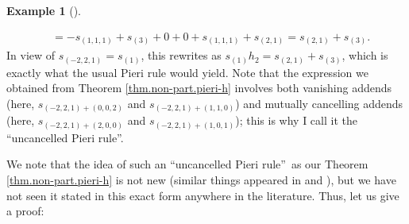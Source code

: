 \documentclass[numbers=enddot,12pt,final,onecolumn,notitlepage]{scrartcl}%
\theoremstyle{definition}
\newtheorem{exmp}[theo]{Example}
\newenvironment{example}[1][]
{\begin{exmp}[#1]\begin{leftbar}}
{\end{leftbar}\end{exmp}}
\begin{document}
\begin{example}
\begin{align*}
&  =-s_{\left(  1,1,1\right)  }+s_{\left(  3\right)  }+0+0+s_{\left(
1,1,1\right)  }+s_{\left(  2,1\right)  }=s_{\left(  2,1\right)  }+s_{\left(
3\right)  }.
\end{align*}
In view of $s_{\left(  -2,2,1\right)  }=s_{\left(  1\right)  }$, this rewrites
as $s_{\left(  1\right)  }h_{2}=s_{\left(  2,1\right)  }+s_{\left(  3\right)
}$, which is exactly what the usual Pieri rule would yield. Note that the
expression we obtained from Theorem \ref{thm.non-part.pieri-h} involves both
vanishing addends (here, $s_{\left(  -2,2,1\right)  +\left(  0,0,2\right)  }$
and $s_{\left(  -2,2,1\right)  +\left(  1,1,0\right)  }$) and mutually
cancelling addends (here, $s_{\left(  -2,2,1\right)  +\left(  2,0,0\right)  }$
and $s_{\left(  -2,2,1\right)  +\left(  1,0,1\right)  }$); this is why I call
it the \textquotedblleft uncancelled Pieri rule\textquotedblright.
\end{example}

We note that the idea of such an \textquotedblleft uncancelled Pieri
rule\textquotedblright\ as our Theorem \ref{thm.non-part.pieri-h} is not new
(similar things appeared in \cite[\S 2]{LakTho07} and \cite{Tamvak13}), but we
have not seen it stated in this exact form anywhere in the literature. Thus,
let us give a proof:
\end{document}
